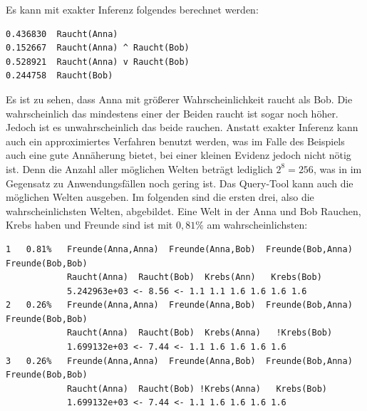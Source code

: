 Es kann mit exakter Inferenz folgendes berechnet werden: 
\begin{lstlisting}[backgroundcolor=\color{backcolour}]
0.436830  Raucht(Anna)
0.152667  Raucht(Anna) ^ Raucht(Bob)
0.528921  Raucht(Anna) v Raucht(Bob)
0.244758  Raucht(Bob)
\end{lstlisting} 
Es ist zu sehen, dass Anna mit größerer Wahrscheinlichkeit raucht als Bob. Die wahrscheinlich das mindestens einer der Beiden raucht ist sogar noch höher. Jedoch ist es unwahrscheinlich das beide rauchen. \newline
Anstatt exakter Inferenz kann auch ein approximiertes Verfahren benutzt werden, was im Falle des Beispiels auch eine gute Annäherung bietet, bei einer kleinen Evidenz jedoch nicht nötig ist. Denn die Anzahl aller möglichen Welten beträgt lediglich $2^8 = 256$, was in im Gegensatz zu Anwendungsfällen noch gering ist. Das Query-Tool kann auch die möglichen Welten ausgeben. Im folgenden sind die ersten drei, also die wahrscheinlichsten Welten, abgebildet. Eine Welt in der Anna und Bob Rauchen, Krebs haben und Freunde sind ist mit $0,81\%$ am wahrscheinlichsten:
\begin{lstlisting}[backgroundcolor=\color{backcolour}]
1   0.81%   Freunde(Anna,Anna)  Freunde(Anna,Bob)  Freunde(Bob,Anna)  Freunde(Bob,Bob)
            Raucht(Anna)  Raucht(Bob)  Krebs(Ann)   Krebs(Bob)
            5.242963e+03 <- 8.56 <- 1.1 1.1 1.6 1.6 1.6 1.6
2   0.26%   Freunde(Anna,Anna)  Freunde(Anna,Bob)  Freunde(Bob,Anna)  Freunde(Bob,Bob)
            Raucht(Anna)  Raucht(Bob)  Krebs(Anna)   !Krebs(Bob)
            1.699132e+03 <- 7.44 <- 1.1 1.6 1.6 1.6 1.6
3   0.26%   Freunde(Anna,Anna)  Freunde(Anna,Bob)  Freunde(Bob,Anna)  Freunde(Bob,Bob)
            Raucht(Anna)  Raucht(Bob) !Krebs(Anna)   Krebs(Bob)
            1.699132e+03 <- 7.44 <- 1.1 1.6 1.6 1.6 1.6
\end{lstlisting}  